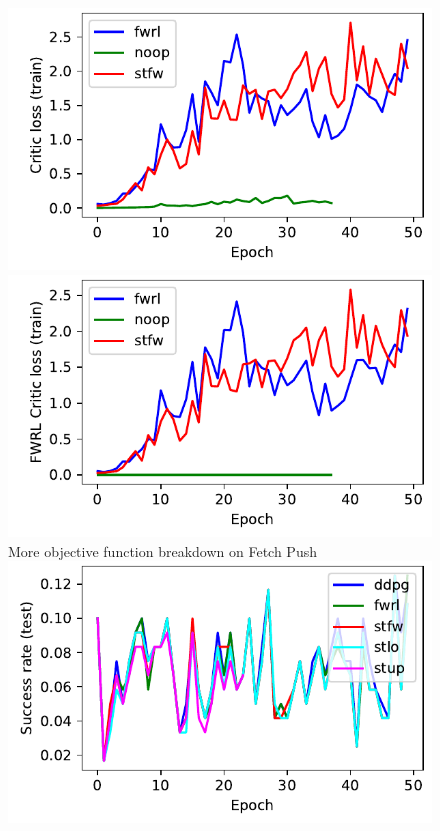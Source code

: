 \begin{figure}
  \includegraphics[width=\frac\columnwidth]{media/res/ea0e35b-FetchPush-v1-stfw-none/train/critic_loss.pdf}%
  \includegraphics[width=\frac\columnwidth]{media/res/ea0e35b-FetchPush-v1-stfw-none/train/critic_addnl_loss.pdf}
More objective function breakdown on Fetch Push\\
  \includegraphics[width=\frac\columnwidth]{media/res/f84daa7-FetchPush-v1-stfw-none/test/success_rate.pdf}%

\end{figure}
